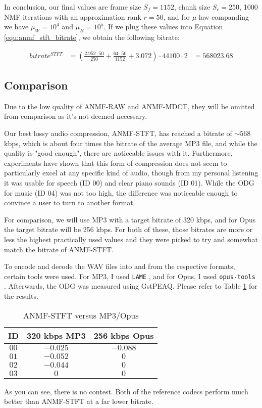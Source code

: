In conclusion, our final values are frame size $S_f = 1152$, chunk size $S_c = 250$, 1000 NMF iterations with an approximation rank $r = 50$, and for $\mu$-law companding we have $\mu_W = 10^4$ and $\mu_H = 10^5$. If we plug these values into Equation \ref{equ:anmf_stft_bitrate}, we obtain the following bitrate:

\begin{align}
bitrate^{STFT} &= \left( \frac{2.952 \cdot 50}{250} + \frac{64 \cdot 50}{1152} + 3.072 \right) \cdot 44100 \cdot 2
&= 568023.68
\end{align}

\subsection{Comparison}
Due to the low quality of ANMF-RAW and ANMF-MDCT, they will be omitted from comparison as it's not deemed necessary.

Our best lossy audio compression, ANMF-STFT, has reached a bitrate of $\sim 568$ kbps, which is about four times the bitrate of the average MP3 file, and while the quality is "good enough", there are noticeable issues with it. Furthermore, experiments have shown that this form of compression does not seem to particularly excel at any specific kind of audio, though from my personal listening it was usable for speech (ID 00) and clear piano sounds (ID 01). While the ODG for music (ID 04) was not too high, the difference was noticeable enough to convince a user to turn to another format.

For comparison, we will use MP3 with a target bitrate of 320 kbps, and for Opus the target bitrate will be 256 kbps. For both of these, those bitrates are more or less the highest practically used values and they were picked to try and somewhat match the bitrate of ANMF-STFT.

To encode and decode the WAV files into and from the respective formats, certain tools were used. For MP3, I used \verb|LAME| \cite{mp3_lame}, and for Opus, I used \verb|opus-tools| \cite{opus_tools}. Afterwards, the ODG was measured using GstPEAQ. Please refer to Table \ref{tab:anmf_comparison} for the results.

\begin{table}[htbp]\caption{ANMF-STFT versus MP3/Opus}
	\label{tab:anmf_comparison}
	\centering
	\begin{tabular}{|c|c|c|}
		\hline
		ID & 320 kbps MP3 & 256 kbps Opus \\ \hline
		$00$ & $-0.025$ & $-0.088$ \\
		$01$ & $-0.052$ & $0$ \\
		$02$ & $-0.044$ & $0$ \\
		$03$ & $0$ & $0$ \\
		\hline
	\end{tabular}
\end{table}

As you can see, there is no contest. Both of the reference codecs perform much better than ANMF-STFT at a far lower bitrate.
